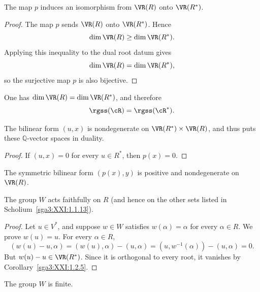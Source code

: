 \begin{corollary}\label{sga3:XXI:1.2.3}
The map \(p\) induces an isomorphism from \(\VR(R)\) onto
\(\VR(R^\ast)\).
\end{corollary}

\begin{proof}
The map \(p\) sends \(\VR(R)\) onto \(\VR(R^\ast)\). Hence
\[
 \dim\VR(R)\geq\dim\VR(R^\ast).
\]
Applying this inequality to the dual root datum gives
\[
 \dim\VR(R)=\dim\VR(R^\ast),
\]
so the surjective map \(p\) is also bijective.
\end{proof}

\begin{corollary}\label{sga3:XXI:1.2.4}
One has \(\dim\VR(R)=\dim\VR(R^\ast)\), and therefore
\[
 \rgss(\cR)=\rgss(\cR^\ast).
\]
\end{corollary}

\begin{corollary}\label{sga3:XXI:1.2.5}
The bilinear form \((u,x)\) is nondegenerate on
\(\VR(R^\ast)\times\VR(R)\), and thus puts these
\(\mathbb Q\)-vector spaces in duality.
\end{corollary}

\begin{proof}
If \((u,x)=0\) for every \(u\in R^\ast\), then \(p(x)=0\).
\end{proof}

\begin{corollary}\label{sga3:XXI:1.2.6}
The symmetric bilinear form \((p(x),y)\) is positive and nondegenerate
on \(\VR(R)\).
\end{corollary}

\begin{corollary}\label{sga3:XXI:1.2.7}
The group \(W\) acts faithfully on \(R\) (and hence on the other sets
listed in Scholium~\ref{sga3:XXI:1.1.13}).
\end{corollary}

\begin{proof}
Let \(u\in V^\ast\), and suppose \(w\in W\) satisfies
\(w(\alpha)=\alpha\) for every \(\alpha\in R\). We prove \(w(u)=u\).
For every \(\alpha\in R\),
\[
 (w(u)-u,\alpha)
 =(w(u),\alpha)-(u,\alpha)
 =(u,w^{-1}(\alpha))-(u,\alpha)=0.
\]
But \(w(u)-u\in\VR(R^\ast)\). Since it is orthogonal to every root, it
vanishes by Corollary~\ref{sga3:XXI:1.2.5}.
\end{proof}

\begin{corollary}\label{sga3:XXI:1.2.8}
The group \(W\) is finite.
\end{corollary}

